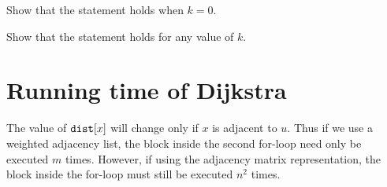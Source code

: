 \begin{Boxample}[5]
Show that the statement holds when $k = 0$.
\end{Boxample}
\begin{Boxample}[20]
Show that the statement holds for any value of $k$.
\end{Boxample}
%
%



\section{Running time of Dijkstra}

The value of $\operatorname{\text{\texttt{dist}}}[x]$ will change only if $x$ is adjacent to $u$.
Thus if we use a weighted adjacency list, the block inside the
second for-loop need only be executed $m$ times. 
However, if using the adjacency matrix representation, the block inside the for-loop
must still be executed $n^2$ times.

